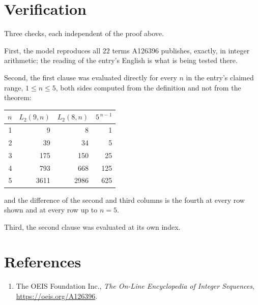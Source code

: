 \documentclass[11pt,a4paper]{article}
\theoremstyle{plain}
\theoremstyle{definition}
\begin{document}
\section{Verification}

Three checks, each independent of the proof above.

First, the model reproduces all $22$ terms A126396 publishes, exactly, in integer
arithmetic; the reading of the entry's English is what is being tested there.

Second, the first clause was evaluated directly for every $n$ in the entry's claimed range,
$1\le n\le5$, both sides computed from the definition and not from the theorem:

\begin{center}
\begin{tabular}{rrrr}
$n$ & $L_{2}(9,n)$ & $L_{2}(8,n)$ & $5^{\,n-1}$ \\ \hline
1 & 9 & 8 & 1 \\
2 & 39 & 34 & 5 \\
3 & 175 & 150 & 25 \\
4 & 793 & 668 & 125 \\
5 & 3611 & 2986 & 625 \\
\end{tabular}
\end{center}

\noindent and the difference of the second and third columns is the fourth at every row shown
and at every row up to $n=5$.

Third, the second clause was evaluated at its own index.

\section*{References}
\begin{enumerate}
\item The OEIS Foundation Inc., \emph{The On-Line Encyclopedia of Integer Sequences},
\url{https://oeis.org/A126396}.
\end{enumerate}
\end{document}
